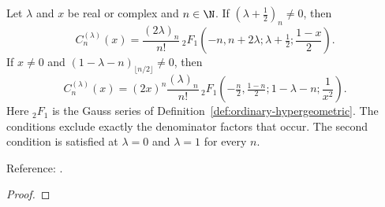 \begin{theorem}
\label{thm:gegenbauer-hypergeometric}
\leanok
Let $\lambda$ and $x$ be real or complex and $n\in\N$. If
$(\lambda+\tfrac12)_n\ne0$, then
\[C_n^{(\lambda)}(x)=\frac{(2\lambda)_n}{n!}\,
 {}_2F_1\!\left(-n,n+2\lambda;\lambda+\tfrac12;\frac{1-x}2\right).\]
If $x\ne0$ and $(1-\lambda-n)_{\lfloor n/2\rfloor}\ne0$, then
\[C_n^{(\lambda)}(x)=(2x)^n\frac{(\lambda)_n}{n!}\,
 {}_2F_1\!\left(-\tfrac n2,\tfrac{1-n}2;1-\lambda-n;\frac1{x^2}\right).\]
Here ${}_2F_1$ is the Gauss series of Definition~\ref{def:ordinary-hypergeometric}. The conditions exclude exactly the
denominator factors that occur. The second condition is satisfied at
$\lambda=0$ and $\lambda=1$ for every $n$.

Reference: \cite[18.5.9 and 18.5.10]{dlmf}.
\end{theorem}
\begin{proof}
\leanok
\end{proof}

